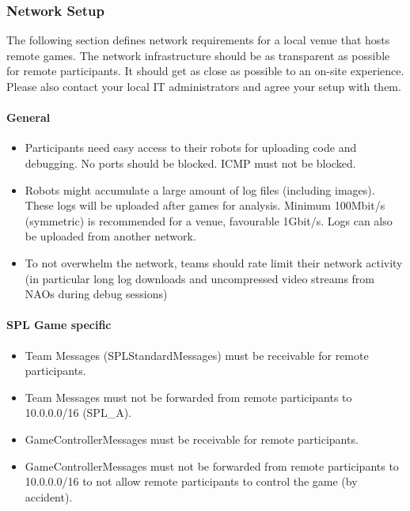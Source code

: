 \subsubsection{Network Setup}
The following section defines network requirements for a local venue that hosts remote games. The network infrastructure should be as transparent as possible for remote participants. It should get as close as possible to an on-site experience. Please also contact your local IT administrators and agree your setup with them.

\paragraph{General}

\begin{itemize}
    \item Participants need easy access to their robots for uploading code and debugging. No ports should be blocked. ICMP must not be blocked. %
    \item Robots might accumulate a large amount of log files (including images). These logs will be uploaded after games for analysis. Minimum 100Mbit/s (symmetric) is recommended for a venue, favourable 1Gbit/s. Logs can also be uploaded from another network.
    \item To not overwhelm the network, teams should rate limit their network activity (in particular long log downloads and uncompressed video streams from NAOs during debug sessions)
\end{itemize}

\paragraph{SPL Game specific}

\begin{itemize}
    \item Team Messages (SPLStandardMessages) must be receivable for remote participants.
    \item Team Messages must not be forwarded from remote participants to 10.0.0.0/16 (SPL\_A).
    \item GameControllerMessages must be receivable for remote participants.
    \item GameControllerMessages must not be forwarded from remote participants to 10.0.0.0/16 to not allow remote participants to control the game (by accident).
\end{itemize}

